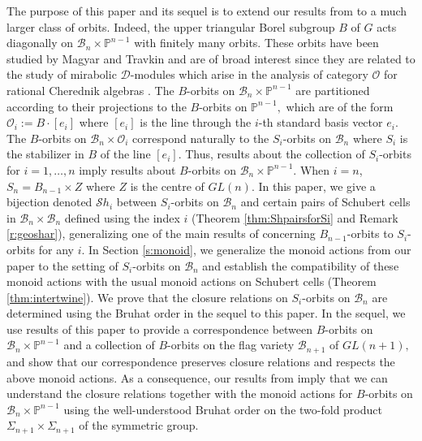 \documentclass[12pt]{amsart}
\numberwithin{equation}{section}
\theoremstyle{remark}
\theoremstyle{definition}
\newcommand{\B}{\mathcal{B}}
\newcommand{\Sh}{\mathcal{S}h}
\begin{document}
The purpose of this paper and its sequel is to extend our results from \cite{Shpairs} to a much larger class of orbits.   Indeed, the upper triangular Borel subgroup $B$ of $G$ acts diagonally on $\B_n \times \mathbb{P}^{n-1}$ with finitely many orbits.   These orbits have been studied  by Magyar \cite{Magyar} and Travkin \cite{Travkin} and are of broad interest since they are related to the study of mirabolic $\mathcal{D}$-modules which arise in the analysis of category $\mathcal{O}$ for rational Cherednik algebras \cite{FG}. 
   The $B$-orbits on $\B_n \times \mathbb{P}^{n-1}$ are partitioned according to their projections to the $B$-orbits  on $\mathbb{P}^{n-1},$ which are of the form $\mathcal{O}_i:=B\cdot [e_{i}]$ where $[e_{i}]$ is the line through the $i$-th standard basis vector $e_{i}.$   The  $B$-orbits on $\B_n \times \mathcal{O}_{i}$ correspond naturally to the $S_i$-orbits on $\B_n$ where $S_i$ is the stabilizer in $B$ of the line $[e_{i}].$  Thus, results about the collection of $S_i$-orbits for $i=1, \dots, n$ imply results about $B$-orbits on $\B_n \times \mathbb{P}^{n-1}.$   When $i=n$, $S_{n}=B_{n-1}\times Z$ where $Z$ is the centre of $GL(n)$.  In this paper, we give a bijection denoted $\Sh_i$  between $S_i$-orbits on $\B_n$ and certain pairs of Schubert cells in $\B_n \times \B_n$ defined using the index $i$ (Theorem \ref{thm:ShpairsforSi} and Remark \ref{r:geoshar}), generalizing one of the main results of \cite{Shpairs} concerning $B_{n-1}$-orbits to $S_{i}$-orbits for any $i$.  In Section \ref{s:monoid}, we generalize the monoid actions from our paper \cite{CE21I} to the setting of $S_{i}$-orbits on $\B_{n}$ and establish the compatibility of these monoid actions with the usual monoid actions on Schubert cells (Theorem \ref{thm:intertwine}).  We prove that the closure relations on $S_i$-orbits on $\B_n$ are determined using the Bruhat order in the sequel to this paper.   In the sequel, we use results of this paper to provide a correspondence between $B$-orbits on $\B_n \times \mathbb{P}^{n-1}$ and a collection of $B$-orbits on the flag variety $\B_{n+1}$ of $GL(n+1),$ and show that our correspondence preserves closure relations and respects the above monoid actions.   As a consequence, our results from \cite{Shpairs} imply that we can understand the closure relations together with the monoid actions for $B$-orbits on $\B_n \times \mathbb{P}^{n-1}$ using the well-understood Bruhat order on the two-fold product $\Sigma_{n+1} \times \Sigma_{n+1}$ of the symmetric group. 
\end{document}
